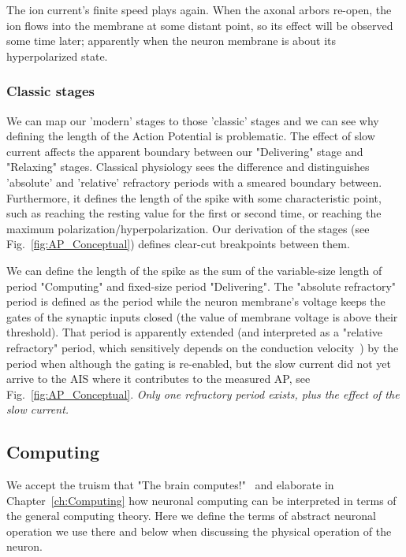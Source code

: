The ion current's finite speed plays again. When the axonal arbors re-open,
the ion flows into the membrane at some distant point, so its effect
will be observed some time later; apparently when the neuron membrane is
about its hyperpolarized state. 


 
\subsubsection[Classic]{Classic stages\label{sec:Single-OperationClassicStages}}
We can map our 'modern' stages to those 'classic' stages and we can see
why defining the length of the Action Potential
is problematic.
The effect of slow current affects the apparent boundary between our
"Delivering" stage and "Relaxing" stages. 
Classical physiology sees the difference and distinguishes 'absolute' and 
'relative' refractory periods with a smeared boundary between. Furthermore,
it defines the length of the spike with some characteristic point,
such as reaching the resting value for the first or second time, or
reaching the maximum polarization/hyperpolarization.  Our derivation of the stages (see Fig.~\ref{fig:AP_Conceptual}) defines clear-cut breakpoints between them.

We can define the length of the spike as the sum of the variable-size length of period "Computing" and fixed-size period "Delivering". The "absolute refractory" 
period is defined as the period while the neuron membrane's voltage keeps
the gates of the synaptic inputs closed (the value of membrane voltage is above their threshold). That period is apparently extended 
(and interpreted as a "relative refractory" period, which sensitively depends
on the conduction velocity~\cite{APTemperatureDependenceRefractory:2001})
by the period when although the gating is re-enabled, but the slow current did not
yet arrive to the 
\gls{AIS}
where it contributes to the measured 
\gls{AP}, see Fig.~\ref{fig:AP_Conceptual}.  \textit{Only one refractory period exists,
plus the effect of the slow current.}

\subsection[Computing]{Computing\label{sec:Single-Computing}}

We accept the truism that "The brain computes!"~\cite{KochBiophysics:1999} and elaborate in Chapter~\ref{ch:Computing}
how neuronal computing can be interpreted in terms of 
the general computing theory.
Here we define the terms of abstract neuronal operation
we use there and below when discussing the physical operation of the neuron.


